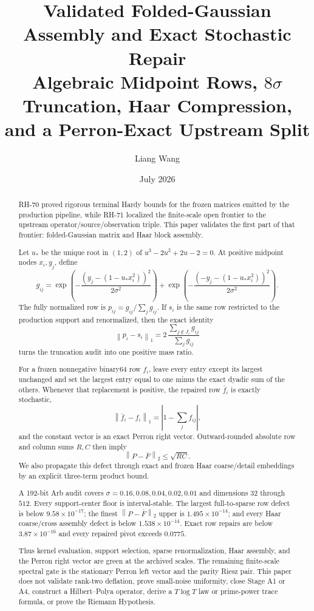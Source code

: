 \documentclass[11pt]{article}
\title{Validated Folded-Gaussian Assembly and Exact Stochastic Repair\\
\large Algebraic Midpoint Rows, $8\sigma$ Truncation, Haar Compression, and a Perron-Exact Upstream Split}
\author{Liang Wang}
\date{July 2026}
\theoremstyle{definition}
\newcommand{\norm}[1]{\left\lVert#1\right\rVert}
\begin{document}
\maketitle

\begin{abstract}
RH-70 proved rigorous terminal Hardy bounds for the frozen matrices emitted by
the production pipeline, while RH-71 localized the finite-scale open frontier
to the upstream operator/source/observation triple.  This paper validates the
first part of that frontier: folded-Gaussian matrix and Haar block assembly.

Let $u_*$ be the unique root in $(1,2)$ of
$u^3-2u^2+2u-2=0$.  At positive midpoint nodes $x_i,y_j$, define
\[
 g_{ij}=
 \exp\!\left(-\frac{(y_j-(1-u_*x_i^2))^2}{2\sigma^2}\right)
 +
 \exp\!\left(-\frac{(-y_j-(1-u_*x_i^2))^2}{2\sigma^2}\right).
\]
The fully normalized row is $p_{ij}=g_{ij}/\sum_jg_{ij}$.  If $s_i$ is the
same row restricted to the production support and renormalized, then the
exact identity
\[
 \norm{p_i-s_i}_1
 =2\,\frac{\sum_{j\notin J_i}g_{ij}}{\sum_jg_{ij}}
\]
turns the truncation audit into one positive mass ratio.

For a frozen nonnegative binary64 row $f_i$, leave every entry except its
largest unchanged and set the largest entry equal to one minus the exact
dyadic sum of the others.  Whenever that replacement is positive, the
repaired row $\bar f_i$ is exactly stochastic,
\[
 \norm{\bar f_i-f_i}_1
 =\left|1-\sum_jf_{ij}\right|,
\]
and the constant vector is an exact Perron right vector.  Outward-rounded
absolute row and column sums $R,C$ then imply
\[
 \norm{P-\bar F}_2\le\sqrt{RC}.
\]
We also propagate this defect through exact and frozen Haar coarse/detail
embeddings by an explicit three-term product bound.

A 192-bit Arb audit covers
$\sigma=0.16,0.08,0.04,0.02,0.01$ and dimensions $32$ through $512$.
Every support-center floor is interval-stable.  The largest full-to-sparse
row defect is below $9.58\times10^{-17}$; the finest
$\norm{P-\bar F}_2$ upper is $1.495\times10^{-14}$; and every Haar
coarse/cross assembly defect is below $1.538\times10^{-14}$.  Exact row
repairs are below $3.87\times10^{-16}$ and every repaired pivot exceeds
$0.0775$.

Thus kernel evaluation, support selection, sparse renormalization, Haar
assembly, and the Perron right vector are green at the archived scales.  The
remaining finite-scale spectral gate is the stationary Perron left vector and
the parity Riesz pair.  This paper does not validate rank-two deflation,
prove small-noise uniformity, close Stage A1 or A4, construct a
Hilbert--Polya operator, derive a $T\log T$ law or prime-power trace formula,
or prove the Riemann Hypothesis.
\end{abstract}
\end{document}
